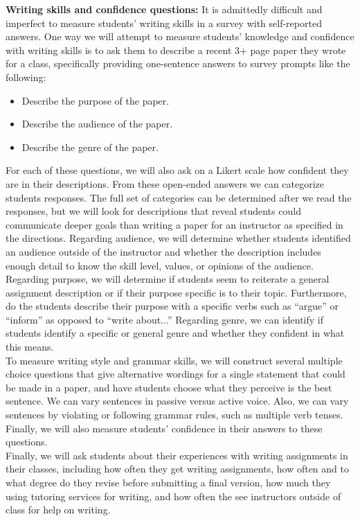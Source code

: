 \documentclass[11pt]{article}
\newcommand{\bi}{
  \begin{itemize}
  \setlength{\itemsep}{0pt}
  \setlength{\parskip}{0pt}
}
\newcommand{\ei}{\end{itemize}}
\begin{document}
\item \textbf{Writing skills and confidence questions:} It is admittedly difficult and imperfect to measure students' writing skills in a survey with self-reported answers.  One way we will attempt to measure students' knowledge and confidence with writing skills is to ask them to describe a recent 3+ page paper they wrote for a class, specifically providing one-sentence answers to survey prompts like the following:
  \bi
  \item Describe the purpose of the paper.
  \item Describe the audience of the paper.
  \item Describe the genre of the paper.
  \ei

  For each of these questions, we will also ask on a Likert scale how confident they are in their descriptions.  From these open-ended answers we can categorize students responses.  The full set of categories can be determined after we read the responses, but we will look for descriptions that reveal students could communicate deeper goals than writing a paper for an instructor as specified in the directions.  Regarding audience, we will determine whether students identified an audience outside of the instructor and whether the description includes enough detail to know the skill level, values, or opinions of the audience.  Regarding purpose, we will determine if students seem to reiterate a general assignment description or if their purpose specific is to their topic.  Furthermore, do the students describe their purpose with a specific verbs such as ``argue'' or  ``inform'' as opposed to ``write about...''  Regarding genre, we can identify if students identify a specific or general genre and whether they confident in what this means.
  \ \\
  
  To measure writing style and grammar skills, we will construct several multiple choice questions that give alternative wordings for a single statement that could be made in a paper, and have students choose what they perceive is the best sentence.  We can vary sentences in passive versus active voice.  Also, we can vary sentences by violating or following grammar rules, such as multiple verb tenses.  Finally, we will also measure students' confidence in their answers to these questions.
  \ \\
  
  Finally, we will ask students about their experiences with writing assignments in their classes, including how often they get writing assignments, how often and to what degree do they revise before submitting a final version, how much they using tutoring services for writing, and how often the see instructors outside of class for help on writing.
\end{document}
